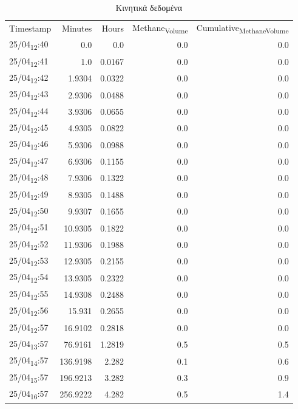\documentclass[11pt]{article}
\begin{document}
\begin{table}[htbp]
\caption{Κινητικά δεδομένα}
\centering
\begin{tabular}{lrrrr}
Timestamp & Minutes & Hours & Methane\textsubscript{Volume} & Cumulative\textsubscript{Methane}\textsubscript{Volume}\\[0pt]
25/04\textsubscript{12}:40 & 0.0 & 0.0 & 0.0 & 0.0\\[0pt]
25/04\textsubscript{12}:41 & 1.0 & 0.0167 & 0.0 & 0.0\\[0pt]
25/04\textsubscript{12}:42 & 1.9304 & 0.0322 & 0.0 & 0.0\\[0pt]
25/04\textsubscript{12}:43 & 2.9306 & 0.0488 & 0.0 & 0.0\\[0pt]
25/04\textsubscript{12}:44 & 3.9306 & 0.0655 & 0.0 & 0.0\\[0pt]
25/04\textsubscript{12}:45 & 4.9305 & 0.0822 & 0.0 & 0.0\\[0pt]
25/04\textsubscript{12}:46 & 5.9306 & 0.0988 & 0.0 & 0.0\\[0pt]
25/04\textsubscript{12}:47 & 6.9306 & 0.1155 & 0.0 & 0.0\\[0pt]
25/04\textsubscript{12}:48 & 7.9306 & 0.1322 & 0.0 & 0.0\\[0pt]
25/04\textsubscript{12}:49 & 8.9305 & 0.1488 & 0.0 & 0.0\\[0pt]
25/04\textsubscript{12}:50 & 9.9307 & 0.1655 & 0.0 & 0.0\\[0pt]
25/04\textsubscript{12}:51 & 10.9305 & 0.1822 & 0.0 & 0.0\\[0pt]
25/04\textsubscript{12}:52 & 11.9306 & 0.1988 & 0.0 & 0.0\\[0pt]
25/04\textsubscript{12}:53 & 12.9305 & 0.2155 & 0.0 & 0.0\\[0pt]
25/04\textsubscript{12}:54 & 13.9305 & 0.2322 & 0.0 & 0.0\\[0pt]
25/04\textsubscript{12}:55 & 14.9308 & 0.2488 & 0.0 & 0.0\\[0pt]
25/04\textsubscript{12}:56 & 15.931 & 0.2655 & 0.0 & 0.0\\[0pt]
25/04\textsubscript{12}:57 & 16.9102 & 0.2818 & 0.0 & 0.0\\[0pt]
25/04\textsubscript{13}:57 & 76.9161 & 1.2819 & 0.5 & 0.5\\[0pt]
25/04\textsubscript{14}:57 & 136.9198 & 2.282 & 0.1 & 0.6\\[0pt]
25/04\textsubscript{15}:57 & 196.9213 & 3.282 & 0.3 & 0.9\\[0pt]
25/04\textsubscript{16}:57 & 256.9222 & 4.282 & 0.5 & 1.4\\[0pt]

\end{tabular}
\end{table}
\end{document}
